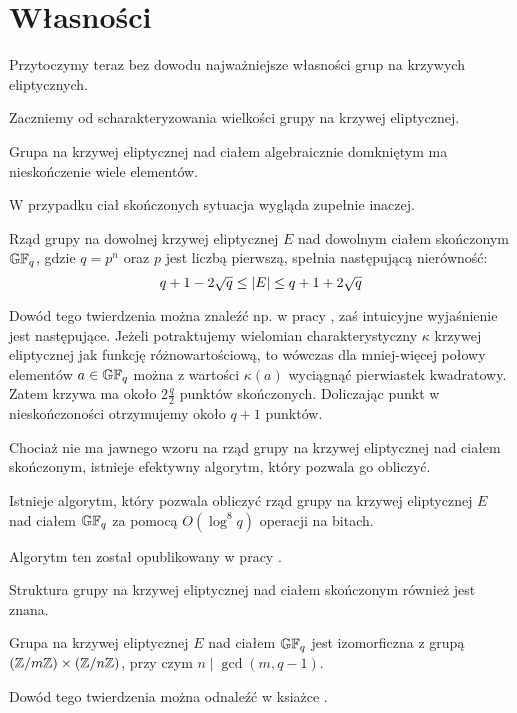 \section{Własności}

Przytoczymy teraz bez dowodu najważniejsze własności
grup na krzywych eliptycznych.

Zaczniemy od scharakteryzowania wielkości grupy na krzywej eliptycznej.

\begin{fact}
Grupa na krzywej eliptycznej nad ciałem algebraicznie domkniętym
ma nieskończenie wiele elementów.
\end{fact}

W przypadku ciał skończonych sytuacja wygląda zupełnie inaczej.

\begin{theorem}[Hasse]
Rząd grupy na dowolnej krzywej eliptycznej $E$
nad dowolnym ciałem skończonym $\mathbb{GF}_q$,
gdzie $q = p^n$ oraz $p$ jest liczbą pierwszą,
spełnia następującą nierówność:
\begin{equation}
q + 1 - 2\sqrt{q} \leq \lvert E\rvert \leq q + 1 + 2\sqrt{q}
\end{equation}
\end{theorem}

Dowód tego twierdzenia można znaleźć np. w pracy \cite{ecintro1},
zaś intuicyjne wyjaśnienie jest następujące.
Jeżeli potraktujemy wielomian charakterystyczny $\kappa$ krzywej eliptycznej
jak funkcję różnowartościową,
to wówczas dla mniej-więcej połowy elementów $a \in \mathbb{GF}_q$
można z wartości $\kappa(a)$ wyciągnąć pierwiastek kwadratowy.
Zatem krzywa ma około $2\frac{q}{2}$ punktów skończonych.
Doliczając punkt w nieskończoności otrzymujemy około $q + 1$ punktów.

Chociaż nie ma jawnego wzoru
na rząd grupy na krzywej eliptycznej nad ciałem skończonym,
istnieje efektywny algorytm, który pozwala go obliczyć.

\begin{theorem}[Shoof]
Istnieje algorytm, który pozwala obliczyć rząd grupy na krzywej eliptycznej $E$
nad ciałem $\mathbb{GF}_q$ za pomocą $O(\log^8 q)$ operacji na bitach.
\end{theorem}

Algorytm ten został opublikowany w pracy \cite{schoof}.

Struktura grupy na krzywej eliptycznej nad ciałem skończonym
również jest znana.

\begin{theorem}
Grupa na krzywej eliptycznej $E$ nad ciałem $\mathbb{GF}_q$
jest izomorficzna z grupą $(\mathbb{Z}/m\mathbb{Z}) \times (\mathbb{Z}/n\mathbb{Z})$,
przy czym $n \mid \gcd(m, q-1)$.
\end{theorem}

Dowód tego twierdzenia można odnaleźć w ksiażce \cite{silverman}.

